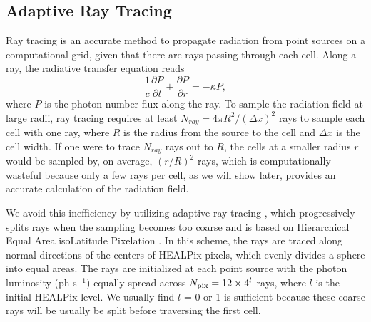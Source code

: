\documentclass[12pt,preprint]{aastex}
\begin{document}


\subsection{Adaptive Ray Tracing}
\label{sec:ART}

Ray tracing is an accurate method to propagate radiation from point
sources on a computational grid, given that there are rays passing
through each cell.  Along a ray, the radiative transfer equation reads
%
\begin{equation}
\label{eqn:rtray}
\frac{1}{c} \frac{\partial P}{\partial t} + \frac{\partial P}{\partial
  r} = -\kappa P,
\end{equation}
%
where $P$ is the photon number flux along the ray.  To sample the
radiation field at large radii, ray tracing requires at least $N_{ray}
= 4\pi R^2 / (\Delta x)^2$ rays to sample each cell with one ray,
where $R$ is the radius from the source to the cell and $\Delta x$ is
the cell width.  If one were to trace $N_{ray}$ rays out to $R$, the
cells at a smaller radius $r$ would be sampled by, on average,
$(r/R)^2$ rays, which is computationally wasteful because only a few
rays per cell, as we will show later, provides an accurate calculation
of the radiation field.

We avoid this inefficiency by utilizing adaptive ray tracing
\citep{Abel02_RT}, which progressively splits rays when the sampling
becomes too coarse and is based on Hierarchical Equal Area isoLatitude
Pixelation \citep[HEALPix;][]{HEALPix}.  In this scheme, the rays are
traced along normal directions of the centers of HEALPix pixels, which
evenly divides a sphere into equal areas.  The rays are initialized at
each point source with the photon luminosity (ph s$^{-1}$) equally
spread across $N_{\rm pix} = 12 \times 4^l$ rays, where $l$ is the
initial HEALPix level.  We usually find $l$ = 0 or 1 is sufficient
because these coarse rays will be usually be split before traversing
the first cell.
\end{document}
